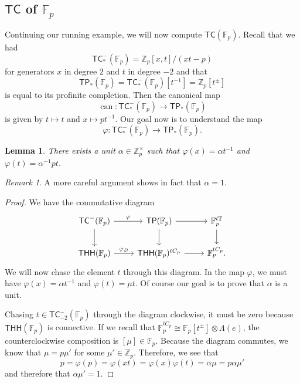 \documentclass[10pt, oneside]{memoir}
\newtheorem{lem}[thm]{Lemma}
\theoremstyle{definition}
\theoremstyle{remark}
\newtheorem{rmk}[thm]{Remark}
\theoremstyle{plain}
\theoremstyle{definition}
\theoremstyle{remark}
\newcommand{\Z}{\mathbb{Z}}
\newcommand{\F}{\mathbb{F}}
\newcommand{\T}{\mathbb{T}}
\newcommand{\on}[1]{\operatorname{#1}}
\newcommand{\ms}[1]{\mathsf{#1}}
\newcommand{\1}{\mathbf{1}}
\newcommand{\2}{\mathbf{2}}
\newcommand{\3}{\mathbf{3}}
\newcommand{\THH}{\ms{THH}}
\newcommand{\TC}{\ms{TC}}
\newcommand{\TP}{\ms{TP}}
\begin{document}
\subsection{$\TC$ of $\F_p$}%
\label{sub:TC of Fp}

Continuing our running example, we will now compute $\TC(\F_p)$. Recall that we had
\[ \TC_*^-(\F_p) = \Z_p[x,t]/(xt-p) \]
for generators $x$ in degree $2$ and $t$ in degree $-2$ and that
\[ \TP_*(\F_p) = \TC_*^-(\F_p)[t^{-1}] = \Z_p[t^{\pm}] \]
is equal to its profinite completion. Then the canonical map
\[ \on{can} \colon \TC_*^-(\F_p) \to \TP_*(\F_p) \]
is given by $t \mapsto t$ and $x \mapsto pt^{-1}$. Our goal now is to understand the map
\[ \varphi \colon \TC_*^-(\F_p) \to \TP_*(\F_p). \]

\begin{lem}
    There exists a unit $\alpha \in \Z_p^{\times}$ such that $\varphi(x) = \alpha t^{-1}$ and $\varphi(t) = \alpha^{-1} pt$.
\end{lem}

\begin{rmk}
    A more careful argument shows in fact that $\alpha = 1$.
\end{rmk}

\begin{proof}
    We have the commutative diagram
    \begin{equation*}
    \begin{tikzcd}
        \TC^-(\F_p) \ar{r}{\varphi} \ar{d} & \TP(\F_p) \ar{d} \ar{r} & \F_p^{t\T} \ar{d} \\
        \THH(\F_p) \ar{r}{\varphi_D} & \THH(\F_p)^{t C_p} \ar{r} & \F_p^{t C_p}.
    \end{tikzcd}
    \end{equation*}
    We will now chase the element $t$ through this diagram. In the map $\varphi$, we must have $\varphi(x) = \alpha t^{-1}$ and $\varphi(t) = \mu t$. Of course our goal is to prove that $\alpha$ is a unit. 
    
    Chasing $t \in \TC^-_{-2}(\F_p)$ through the diagram clockwise, it must be zero because $\THH(\F_p)$ is connective. If we recall that $\F_p^{t C_p} \cong \F_p[t^{\pm}] \otimes \Lambda(e)$, the counterclockwise composition is $[\mu] \in \F_p$. Because the diagram commutes, we know that $\mu = p \mu'$ for some $\mu' \in \Z_p$. Therefore, we see that
    \[ p = \varphi(p) = \varphi(xt) = \varphi(x) \varphi(t) = \alpha \mu = p \alpha \mu' \]
    and therefore that $\alpha \mu' = 1$.
\end{proof}
\end{document}
